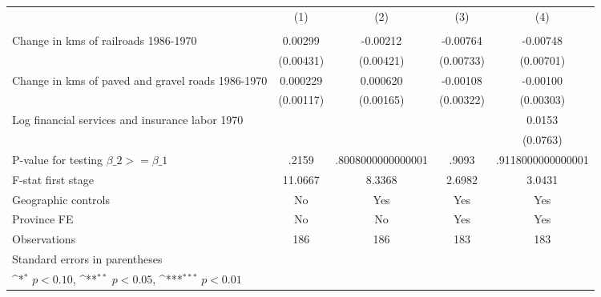 {
\def\sym#1{\ifmmode^{#1}\else\(^{#1}\)\fi}
\begin{tabular}{l*{4}{c}}
\hline\hline
                &\multicolumn{1}{c}{(1)}&\multicolumn{1}{c}{(2)}&\multicolumn{1}{c}{(3)}&\multicolumn{1}{c}{(4)}\\
                &\multicolumn{1}{c}{}&\multicolumn{1}{c}{}&\multicolumn{1}{c}{}&\multicolumn{1}{c}{}\\
\hline
Change in kms of railroads 1986-1970&  0.00299         & -0.00212         & -0.00764         & -0.00748         \\
                &(0.00431)         &(0.00421)         &(0.00733)         &(0.00701)         \\
[1em]
Change in kms of paved and gravel roads 1986-1970& 0.000229         & 0.000620         & -0.00108         & -0.00100         \\
                &(0.00117)         &(0.00165)         &(0.00322)         &(0.00303)         \\
[1em]
Log financial services and insurance labor 1970&                  &                  &                  &   0.0153         \\
                &                  &                  &                  & (0.0763)         \\
\hline
P-value for testing $\beta\_{2} >= \beta\_{1}$&    .2159         &.8008000000000001         &    .9093         &.9118000000000001         \\
F-stat first stage&  11.0667         &   8.3368         &   2.6982         &   3.0431         \\
Geographic controls&       No         &      Yes         &      Yes         &      Yes         \\
Province FE     &       No         &       No         &      Yes         &      Yes         \\
Observations    &      186         &      186         &      183         &      183         \\
\hline\hline
\multicolumn{5}{l}{\footnotesize Standard errors in parentheses}\\
\multicolumn{5}{l}{\footnotesize \sym{*} \(p<0.10\), \sym{**} \(p<0.05\), \sym{***} \(p<0.01\)}\\
\end{tabular}
}
